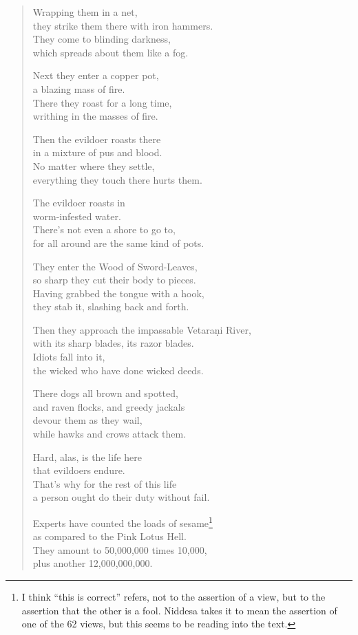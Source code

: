 \documentclass[12pt,openany]{book}%
\begin{document}
\begin{verse}
Wrapping them in a net, \\
they strike them there with iron hammers. \\
They come to blinding darkness, \\
which spreads about them like a fog. 

Next they enter a copper pot, \\
a blazing mass of fire. \\
There they roast for a long time, \\
writhing in the masses of fire. 

Then the evildoer roasts there \\
in a mixture of pus and blood. \\
No matter where they settle, \\
everything they touch there hurts them. 

The evildoer roasts in \\
worm-infested water. \\
There’s not even a shore to go to, \\
for all around are the same kind of pots. 

They enter the Wood of Sword-Leaves, \\
so sharp they cut their body to pieces. \\
Having grabbed the tongue with a hook, \\
they stab it, slashing back and forth. 

Then they approach the impassable  \textsanskrit{Vetaraṇi} River, \\
with its sharp blades, its razor blades. \\
Idiots fall into it, \\
the wicked who have done wicked deeds. 

There dogs all brown and spotted, \\
and raven flocks, and greedy jackals \\
devour them as they wail, \\
while hawks and crows attack them. 

Hard, alas, is the life here \\
that evildoers endure. \\
That’s why for the rest of this life \\
a person ought do their duty without fail. 

Experts have counted the loads of sesame\footnote{I think “this is correct” refers, not to the assertion of a view, but to the assertion that the other is a fool. Niddesa takes it to mean the assertion of one of the 62 views, but this seems to be reading into the text. } \\
as compared to the Pink Lotus Hell. \\
They amount to 50,000,000 times 10,000, \\
plus another 12,000,000,000. 


\end{verse}
\end{document}
